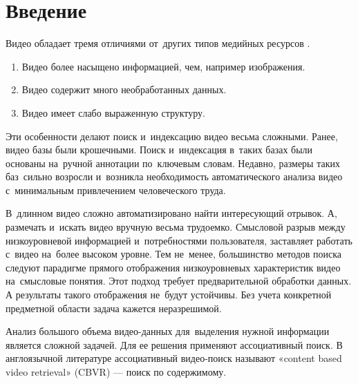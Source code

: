 
%
%
%

\section{Введение}


\noindent
Видео обладает тремя отличиями от~других типов медийных
ресурсов \cite{Nabeel:2014}.
\begin{enumerate}
    \item Видео более насыщено информацией, чем, например изображения.
    \item Видео содержит много необработанных данных.
    \item Видео имеет слабо выраженную структуру.
\end{enumerate}
Эти особенности делают поиск и~индексацию видео весьма сложными.
Ранее, видео базы были крошечными.
Поиск и~индексация в~таких базах были основаны
на~ручной аннотации по~ключевым словам.
Недавно, размеры таких баз~сильно возросли
и~возникла необходимость автоматического анализа видео
с~минимальным привлечением человеческого труда.

В~длинном видео сложно автоматизировано найти интересующий отрывок.
А, размечать и~искать видео вручную весьма трудоемко.
Смысловой разрыв между низкоуровневой информацией
и~потребностями пользователя, заставляет работать
с~видео на~более высоком уровне.
Тем не~менее, большинство методов поиска следуют парадигме
прямого отображения низкоуровневых характеристик видео
на~смысловые понятия.
Этот подход требует предварительной обработки данных.
А результаты такого отображения не~будут устойчивы.
Без учета конкретной предметной области задача кажется неразрешимой.

Анализ большого объема видео-данных для~выделения нужной
информации является сложной задачей.
Для ее решения применяют ассоциативный поиск.
В англоязычной литературе ассоциативный видео-поиск называют
«content based video retrieval» (CBVR) —
поиск по содержимому.

